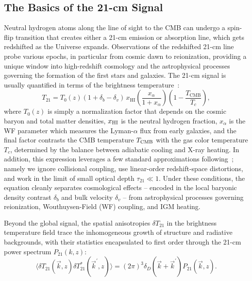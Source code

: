 \subsection{The Basics of the 21-cm Signal}
\noindent Neutral hydrogen atoms along the line of sight to the CMB can undergo a spin-flip transition that creates either a 21-cm emission or absorption line, which gets redshifted as the Universe expands. Observations of the redshifted 21-cm line probe various epochs, in particular from cosmic dawn to reionization, providing a unique window into high-redshift cosmology and the astrophysical processes governing the formation of the first stars and galaxies. The 21-cm signal is usually quantified in terms of the brightness temperature~\citep{Furlanetto:2006jb}:
\begin{equation} \label{eq:ch14-T21}
    T_{21}=T_0(z)\left(1+\delta_b-\delta_v\right)\, x_{\mathrm{HI}}\left(\frac{x_\alpha}{1+x_\alpha}\right)\left(1-\frac{T_{\mathrm{CMB}}}{T_c}\right),
\end{equation}
where  $T_0(z)$ is simply a normalization factor that depends on the cosmic baryon and total matter densities, $x_{\rm HI}$ is the neutral hydrogen fraction, $x_\alpha$ is the WF parameter which measures the Lyman-$\alpha$ flux from early galaxies, and the final factor contrasts the CMB temperature $T_{\rm CMB}$ with the gas color temperature $T_c$, determined by the balance between adiabatic cooling and X-ray heating. In addition, this expression leverages a few standard approximations following~\citep{munoz23,munoz23b,Cruz:2024fsv}; namely we ignore collisional coupling, use linear-order redshift-space distortions, and work in the limit of small optical depth $\tau_{21} \ll 1$. Under these conditions, the equation cleanly separates cosmological effects -- encoded in the local baryonic density contrast $\delta_b$ and bulk velocity $\delta_v$ --
from astrophysical processes governing reionization, Wouthuysen-Field (WF) coupling, and IGM heating.

Beyond the global signal, the spatial anisotropies $\delta T_{21}$ in the brightness temperature field trace the inhomogeneous growth of structure and radiative backgrounds, with their statistics encapsulated to first order through the 21-cm power spectrum $P_{21}(k, z)$:
\begin{equation}
    \langle \delta T_{21}(\vec{k}, z)\delta T^*_{21}(\vec{k}^\prime,z)\rangle= (2\pi)^3\delta_D(\vec{k} + \vec{k}^\prime) P_{21}(\vec{k}, z).
\end{equation}


